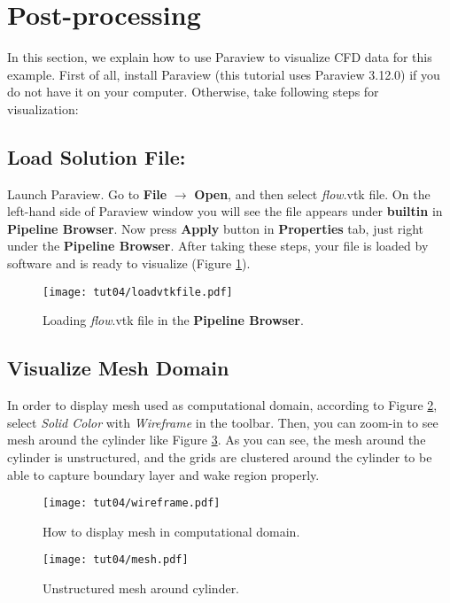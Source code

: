 \section{Post-processing}
In this section, we explain how to use Paraview to visualize CFD data for this example. First of all, install Paraview (this tutorial uses Paraview 3.12.0) if you do not have it on your computer. Otherwise, take following steps for visualization:
\subsection{Load Solution File:}
Launch Paraview. Go to \textbf{File} $\rightarrow$ \textbf{Open}, and then select \textit{flow}.vtk file. On the left-hand side of Paraview window you will see the file appears under \textbf{builtin} in \textbf{Pipeline Browser}. Now press \textbf{Apply} button in \textbf{Properties} tab, just right under the \textbf{Pipeline Browser}. After taking these steps, your file is loaded by software and is ready to visualize (Figure \ref{fig4:load}).
\begin{figure}[htbp]
    \centering
    \texttt{[image: tut04/loadvtkfile.pdf]}
    \caption{Loading \textit{flow}.vtk file in the \textbf{Pipeline Browser}.}
    \label{fig4:load}
\end{figure}
\subsection{Visualize Mesh Domain}
In order to display mesh used as computational domain, according to Figure \ref{fig4:wireframe_4}, select \textit{Solid Color} with \textit{Wireframe} in the toolbar. Then, you can zoom-in to see mesh around the cylinder like Figure \ref{fig4:mesh_4}. As you can see, the mesh around the cylinder is unstructured, and the grids are clustered around the cylinder to be able to capture boundary layer and wake region properly.
\begin{figure}[htbp]
    \centering
    \texttt{[image: tut04/wireframe.pdf]}
    \caption{How to display mesh in computational domain.}
    \label{fig4:wireframe_4}
\end{figure}
\begin{figure}[htbp]
    \centering
    \texttt{[image: tut04/mesh.pdf]}
    \caption{Unstructured mesh around cylinder.}
    \label{fig4:mesh_4}
\end{figure}
